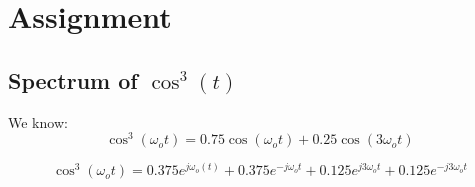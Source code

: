 \documentclass[12pt, a4paper]{article}
\begin{document}
\section{Assignment}
\subsection{Spectrum of $\cos^{3}(t)$}
We know:
\begin{equation*}
    \cos^{3}(\omega_{o}t) = 0.75\cos(\omega_{o}t) + 0.25\cos(3\omega_{o}t) 
\end{equation*}

\begin{equation*}
    \cos^{3}(\omega_{o}t) = 0.375e^{j\omega_{o}(t)} + 0.375e^{-j\omega_{o} t} + 0.125e^{j3\omega_{o}t} + 0.125e^{-j3\omega_{o}t}
\end{equation*}
\end{document}
